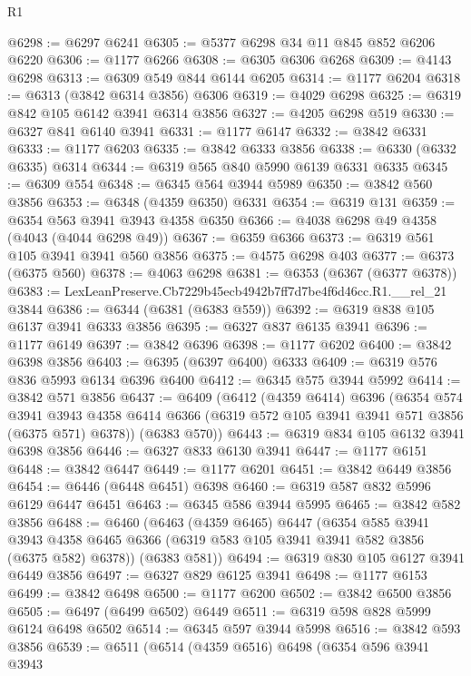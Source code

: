 \begin{lexlean}{R1}
\begin{coremodule}
@6298 := @6297 @6241
@6305 := @5377 @6298 @34 @11 @845 @852 @6206 @6220
@6306 := @1177 @6266
@6308 := @6305 @6306 @6268
@6309 := @4143 @6298
@6313 := @6309 @549 @844 @6144 @6205
@6314 := @1177 @6204
@6318 := @6313 (@3842 @6314 @3856) @6306
@6319 := @4029 @6298
@6325 := @6319 @842 @105 @6142 @3941 @6314 @3856
@6327 := @4205 @6298 @519
@6330 := @6327 @841 @6140 @3941
@6331 := @1177 @6147
@6332 := @3842 @6331
@6333 := @1177 @6203
@6335 := @3842 @6333 @3856
@6338 := @6330 (@6332 @6335) @6314
@6344 := @6319 @565 @840 @5990 @6139 @6331 @6335
@6345 := @6309 @554
@6348 := @6345 @564 @3944 @5989
@6350 := @3842 @560 @3856
@6353 := @6348 (@4359 @6350) @6331
@6354 := @6319 @131
@6359 := @6354 @563 @3941 @3943 @4358 @6350
@6366 := @4038 @6298 @49 @4358 (@4043 (@4044 @6298 @49))
@6367 := @6359 @6366
@6373 := @6319 @561 @105 @3941 @3941 @560 @3856
@6375 := @4575 @6298 @403
@6377 := @6373 (@6375 @560)
@6378 := @4063 @6298
@6381 := @6353 (@6367 (@6377 @6378))
@6383 := LexLeanPreserve.Cb7229b45ecb4942b7ff7d7be4f6d46cc.R1.__rel_21 @3844
@6386 := @6344 (@6381 (@6383 @559))
@6392 := @6319 @838 @105 @6137 @3941 @6333 @3856
@6395 := @6327 @837 @6135 @3941
@6396 := @1177 @6149
@6397 := @3842 @6396
@6398 := @1177 @6202
@6400 := @3842 @6398 @3856
@6403 := @6395 (@6397 @6400) @6333
@6409 := @6319 @576 @836 @5993 @6134 @6396 @6400
@6412 := @6345 @575 @3944 @5992
@6414 := @3842 @571 @3856
@6437 := @6409
    (@6412
      (@4359 @6414)
      @6396
      (@6354
        @574
        @3941
        @3943
        @4358
        @6414
        @6366
        (@6319 @572 @105 @3941 @3941 @571 @3856 (@6375 @571) @6378))
      (@6383 @570))
@6443 := @6319 @834 @105 @6132 @3941 @6398 @3856
@6446 := @6327 @833 @6130 @3941
@6447 := @1177 @6151
@6448 := @3842 @6447
@6449 := @1177 @6201
@6451 := @3842 @6449 @3856
@6454 := @6446 (@6448 @6451) @6398
@6460 := @6319 @587 @832 @5996 @6129 @6447 @6451
@6463 := @6345 @586 @3944 @5995
@6465 := @3842 @582 @3856
@6488 := @6460
    (@6463
      (@4359 @6465)
      @6447
      (@6354
        @585
        @3941
        @3943
        @4358
        @6465
        @6366
        (@6319 @583 @105 @3941 @3941 @582 @3856 (@6375 @582) @6378))
      (@6383 @581))
@6494 := @6319 @830 @105 @6127 @3941 @6449 @3856
@6497 := @6327 @829 @6125 @3941
@6498 := @1177 @6153
@6499 := @3842 @6498
@6500 := @1177 @6200
@6502 := @3842 @6500 @3856
@6505 := @6497 (@6499 @6502) @6449
@6511 := @6319 @598 @828 @5999 @6124 @6498 @6502
@6514 := @6345 @597 @3944 @5998
@6516 := @3842 @593 @3856
@6539 := @6511
    (@6514
      (@4359 @6516)
      @6498
      (@6354
        @596
        @3941
        @3943

\end{coremodule}
\end{lexlean}
